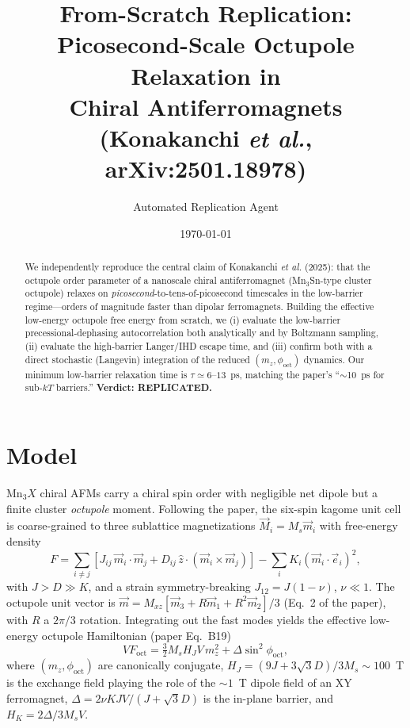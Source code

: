 \documentclass[aps,prl,twocolumn,superscriptaddress,floatfix]{revtex4-2}
\begin{document}
\title{From-Scratch Replication: Picosecond-Scale Octupole Relaxation in\\
Chiral Antiferromagnets (Konakanchi \textit{et al.}, arXiv:2501.18978)}
\author{Automated Replication Agent}
\date{\today}

\begin{abstract}
We independently reproduce the central claim of Konakanchi \textit{et al.}
(2025): that the octupole order parameter of a nanoscale chiral
antiferromagnet (Mn$_3$Sn-type cluster octupole) relaxes on
\emph{picosecond}-to-tens-of-picosecond timescales in the low-barrier
regime---orders of magnitude faster than dipolar ferromagnets. Building the
effective low-energy octupole free energy from scratch, we (i) evaluate the
low-barrier precessional-dephasing autocorrelation both analytically and by
Boltzmann sampling, (ii) evaluate the high-barrier Langer/IHD escape time, and
(iii) confirm both with a direct stochastic (Langevin) integration of the
reduced $(m_z,\phi_{\mathrm{oct}})$ dynamics. Our minimum low-barrier
relaxation time is $\tau\simeq 6$--$13$~ps, matching the paper's
``$\sim$10~ps for sub-$kT$ barriers.'' \textbf{Verdict: REPLICATED.}
\end{abstract}

\maketitle

\section{Model}
Mn$_3X$ chiral AFMs carry a chiral spin order with negligible net dipole but a
finite cluster \emph{octupole} moment. Following the paper, the six-spin kagome
unit cell is coarse-grained to three sublattice magnetizations
$\vec M_i=M_s\vec m_i$ with free-energy density
\begin{equation}
F=\sum_{i\neq j}\!\left[J_{ij}\,\vec m_i\!\cdot\!\vec m_j
+D_{ij}\,\hat z\!\cdot\!(\vec m_i\!\times\!\vec m_j)\right]
-\sum_i K_i(\vec m_i\!\cdot\!\vec e_i)^2 ,
\end{equation}
with $J\!>\!D\!\gg\!K$, and a strain symmetry-breaking $J_{12}=J(1-\nu)$,
$\nu\ll1$. The octupole unit vector is
$\vec m=M_{xz}[\vec m_3+R\vec m_1+R^2\vec m_2]/3$ (Eq.~2 of the paper), with
$R$ a $2\pi/3$ rotation. Integrating out the fast modes yields the effective
low-energy octupole Hamiltonian (paper Eq.~B19)
\begin{equation}
VF_{\mathrm{oct}}=\tfrac{3}{2}M_sH_JV\,m_z^2+\Delta\sin^2\phi_{\mathrm{oct}},
\label{eq:Foct}
\end{equation}
where $(m_z,\phi_{\mathrm{oct}})$ are canonically conjugate,
$H_J=(9J+3\sqrt3 D)/3M_s\sim100$~T is the exchange field playing the role of
the $\sim1$~T dipole field of an XY ferromagnet,
$\Delta=2\nu KJV/(J+\sqrt3 D)$ is the in-plane barrier, and
$H_K=2\Delta/3M_sV$.
\end{document}

